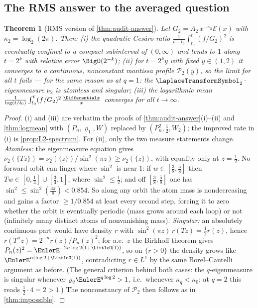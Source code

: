 \documentclass[11pt,oneside]{article}
\newtheorem{theorem}{Theorem}[section]
\theoremstyle{definition}
\theoremstyle{remark}
\newcommand{\T}{T}
\begin{document}
\subsection{The RMS answer to the averaged question}

\begin{theorem}[RMS version of \cref{thm:audit-answer}]
\label{thm:rms-answer}
Let $G_2=A_2\,x^{-\kappa_2}\mathcal E(x)$ with
$\kappa_2=\log_2(2\pi)$.  Then:
(i) the quadratic Ces\`aro ratio
$\frac1{t-t_0}\int_{t_0}^t(f/G_2)^2$ is eventually confined to a compact
subinterval of $(0,\infty)$ and tends to $1$ along $t=2^k$ with relative
error $\BigO(2^{-k})$;
(ii) for $t=2^ky$ with fixed $y\in(1,2)$ it converges to a continuous,
nonconstant mantissa profile $\mathscr P_2(y)$, so the limit for all
$t$ fails --- for the same reason as at $q=1$: the $\LaplaceTransformSymbol_2$-eigenmeasure
$\nu_2$ is atomless and singular;
(iii) the logarithmic mean
$\frac1{\log(t/t_0)}\int_{t_0}^t(f/G_2)^2\,\frac{\Differential x}{x}$ converges
for all $t\to\infty$.
\end{theorem}

\begin{proof}
(i) and (iii) are verbatim the proofs of
\cref{thm:audit-answer}(i)--(ii) and \cref{thm:logmean} with
$(P_n,\varrho_1,W)$ replaced by $(P_n^2,\tfrac12,W_2)$; the improved
rate in (i) is \cref{prop:L2-spectrum}.  For (ii), only the two measure
statements change.  \emph{Atomless:} the eigenmeasure equation gives
$\nu_2(\{\T z\})=\nu_2(\{z\})/\sin^2(\pi z)\ge\nu_2(\{z\})$, with
equality only at $z=\tfrac12$.  No forward orbit can linger where
$\sin^2$ is near $1$: if $w\in[\tfrac38,\tfrac58]$ then
$\T w\in[0,\tfrac14]\cup[\tfrac34,1]$, where $\sin^2\le\tfrac12$; and
off $[\tfrac38,\tfrac58]$ one has $\sin^2\le\sin^2(\tfrac{3\pi}8)<0.854$.
So along any orbit the atom mass is nondecreasing and gains a factor
$\ge1/0.854$ at least every second step, forcing it to zero whether the
orbit is eventually periodic (mass grows around each loop) or not
(infinitely many distinct atoms of nonvanishing mass).
\emph{Singular:} an absolutely continuous part would have density $r$
with $\sin^2(\pi z)\,r(\T z)=\tfrac12r(z)$, hence
$r(\T^nz)=2^{-n}r(z)/P_n(z)^2$; for a.e.\ $z$ the Birkhoff theorem
gives $P_n(z)^2=\EulerE^{-2n\log2(1+\LittleO(1))}$, so on $\{r>0\}$ the
density grows like $\EulerE^{n(\log2+\LittleO(1))}$, contradicting
$r\in L^1$ by the same Borel--Cantelli argument as before.  (The general
criterion behind both cases: the $q$-eigenmeasure is singular whenever
$\varrho_q\EulerE^{q\log2}>1$, i.e.\ whenever $\kappa_q<\kappa_0$; at
$q=2$ this reads $\tfrac12\cdot4=2>1$.)  The nonconstancy of
$\mathscr P_2$ then follows as in \cref{thm:impossible}.
\end{proof}
\end{document}
